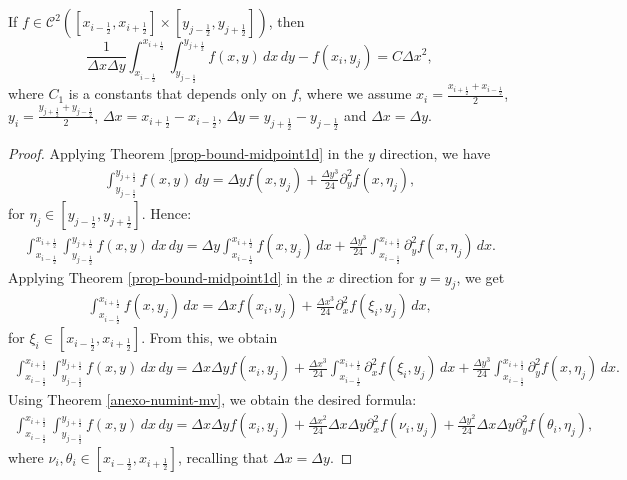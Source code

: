 \begin{thrm}
	\label{prop-bound-midpoint2d}
	If $f \in \mathcal{C}^2([x_{i-\frac{1}{2}},x_{i+\frac{1}{2}}]\times [y_{j-\frac{1}{2}},y_{j+\frac{1}{2}}])$, then 
	\begin{equation}
		\frac{1}{\Delta x \Delta y}\int_{x_{i-\frac{1}{2}}}^{x_{i+\frac{1}{2}}}
		\int_{y_{j-\frac{1}{2}}}^{y_{j+\frac{1}{2}}}{f(x,y)\,dx \,dy}-f(x_i,y_j) = C \Delta x^2, 
	\end{equation}
	where $C_1$ is a constants that depends only on $f$, where we assume $x_i = \frac{x_{i+\frac{1}{2}} + x_{i-\frac{1}{2}}}{2}$,
	$y_i = \frac{y_{j+\frac{1}{2}} + y_{j-\frac{1}{2}}}{2}$, $\Delta x = x_{i+\frac{1}{2}}-x_{i-\frac{1}{2}}$,
	$\Delta y= y_{j+\frac{1}{2}}-y_{j-\frac{1}{2}}$ and $\Delta x = \Delta y$.
\end{thrm}
\begin{proof}
	Applying Theorem \ref{prop-bound-midpoint1d} in the $y$ direction, we have
	\begin{align*}
	\int_{y_{j-\frac{1}{2}}}^{y_{j+\frac{1}{2}}} {f(x,y)\,dy} = \Delta y f(x,y_j) +
	\frac{\Delta y^3}{24}\partial_y^2 f(x, \eta_j),
	\end{align*}
	for $\eta_j\in [y_{j-\frac{1}{2}},y_{j+\frac{1}{2}}]$. Hence:
	\begin{align*}
		\int_{x_{i-\frac{1}{2}}}^{x_{i+\frac{1}{2}}}
		\int_{y_{j-\frac{1}{2}}}^{y_{j+\frac{1}{2}}} {f(x,y)\,dx \,dy} = 
		\Delta y \int_{x_{i-\frac{1}{2}}}^{x_{i+\frac{1}{2}}} {f(x,y_j) \,dx}+
		\frac{\Delta y^3}{24}\int_{x_{i-\frac{1}{2}}}^{x_{i+\frac{1}{2}}} {\partial_y^2 f(x, \eta_j)\,dx}.
	\end{align*}
	Applying Theorem \ref{prop-bound-midpoint1d} in the $x$ direction for $y=y_j$, we get
	\begin{align*}
	\int_{x_{i-\frac{1}{2}}}^{x_{i+\frac{1}{2}}} {f(x,y_j)\,dx} = 
	\Delta x {f(x_i,y_j)}+
	\frac{\Delta x^3}{24} {\partial_x^2 f(\xi_i, y_j)\,dx},
	\end{align*}
	for $\xi_i\in [x_{i-\frac{1}{2}},x_{i+\frac{1}{2}}]$. From this, we obtain
	\begin{align*}
	\int_{x_{i-\frac{1}{2}}}^{x_{i+\frac{1}{2}}}
	\int_{y_{j-\frac{1}{2}}}^{y_{j+\frac{1}{2}}} {f(x,y)\,dx \,dy} = 
	\Delta x \Delta y f(x_i,y_j)+
	\frac{\Delta x^3}{24}\int_{x_{i-\frac{1}{2}}}^{x_{i+\frac{1}{2}}} {\partial_x^2 f(\xi_i, y_j)\,dx}+
	\frac{\Delta y^3}{24}\int_{x_{i-\frac{1}{2}}}^{x_{i+\frac{1}{2}}} {\partial_y^2 f(x, \eta_j)\,dx}.
\end{align*}
Using Theorem \ref{anexo-numint-mv}, we obtain the desired formula:
	\begin{align*}
	\int_{x_{i-\frac{1}{2}}}^{x_{i+\frac{1}{2}}}
	\int_{y_{j-\frac{1}{2}}}^{y_{j+\frac{1}{2}}} {f(x,y)\,dx \,dy} = 
	\Delta x \Delta y f(x_i,y_j)+
	\frac{\Delta x^2}{24}\Delta x \Delta y {\partial_x^2 f(\nu_i, y_j)}+
	\frac{\Delta y^2}{24}\Delta x \Delta y {\partial_y^2 f(\theta_i, \eta_j)},
\end{align*}
where $\nu_i, \theta_i\in [x_{i-\frac{1}{2}},x_{i+\frac{1}{2}}]$, recalling that $\Delta x = \Delta y$.
\end{proof}

